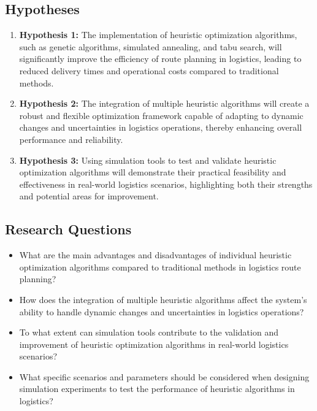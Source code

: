 \documentclass[
]{article}
\begin{document}
    \subsection{Hypotheses}\label{subsec:hypotheses}
    \begin{enumerate}
        \item \textbf{Hypothesis 1:} The implementation of heuristic optimization algorithms, such as genetic algorithms, simulated annealing, and tabu search, will significantly improve the efficiency of route planning in logistics, leading to reduced delivery times and operational costs compared to traditional methods.
        \item \textbf{Hypothesis 2:} The integration of multiple heuristic algorithms will create a robust and flexible optimization framework capable of adapting to dynamic changes and uncertainties in logistics operations, thereby enhancing overall performance and reliability.
        \item \textbf{Hypothesis 3:} Using simulation tools to test and validate heuristic optimization algorithms will demonstrate their practical feasibility and effectiveness in real-world logistics scenarios, highlighting both their strengths and potential areas for improvement.
    \end{enumerate}

    \subsection{Research Questions}\label{subsec:research_questions}
    \begin{itemize}
        \item What are the main advantages and disadvantages of individual heuristic optimization algorithms compared to traditional methods in logistics route planning?
        \item How does the integration of multiple heuristic algorithms affect the system's ability to handle dynamic changes and uncertainties in logistics operations?
        \item To what extent can simulation tools contribute to the validation and improvement of heuristic optimization algorithms in real-world logistics scenarios?
        \item What specific scenarios and parameters should be considered when designing simulation experiments to test the performance of heuristic algorithms in logistics?
    \end{itemize}
\end{document}
